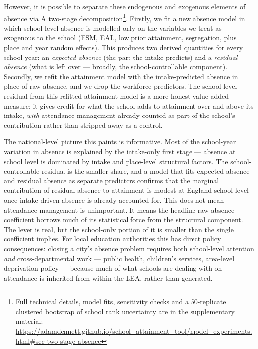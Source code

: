 \documentclass[
  12pt,
  titlepage]{article}
\begin{document}
However, it is possible to separate these endogenous and exogenous
elements of absence via A two-stage decomposition\footnote{Full
  technical details, model fits, sensitivity checks and a 50-replicate
  clustered bootstrap of school rank uncertainty are in the
  supplementary material:
  \url{https://adamdennett.github.io/school_attainment_tool/model_experiments.html\#sec-two-stage-absence}}.
Firstly, we fit a new absence model in which school-level absence is
modelled only on the variables we treat as exogenous to the school (FSM,
EAL, low prior attainment, segregation, plus place and year random
effects). This produces two derived quantities for every school-year: an
\emph{expected absence} (the part the intake predicts) and a
\emph{residual absence} (what is left over --- broadly, the
school-controllable component). Secondly, we refit the attainment model
with the intake-predicted absence in place of raw absence, and we drop
the workforce predictors. The school-level residual from this refitted
attainment model is a more honest value-added measure: it gives credit
for what the school adds to attainment over and above its intake,
\emph{with} attendance management already counted as part of the
school's contribution rather than stripped away as a control.

The national-level picture this paints is informative. Most of the
school-year variation in absence is explained by the intake-only first
stage --- absence at school level is dominated by intake and place-level
structural factors. The school-controllable residual is the smaller
share, and a model that fits expected absence and residual absence as
separate predictors confirms that the marginal contribution of residual
absence to attainment is modest at England school level once
intake-driven absence is already accounted for. This does not mean
attendance management is unimportant. It means the headline raw-absence
coefficient borrows much of its statistical force from the structural
component. The lever is real, but the school-only portion of it is
smaller than the single coefficient implies. For local education
authorities this has direct policy consequences: closing a city's
absence problem requires both school-level attention \emph{and}
cross-departmental work --- public health, children's services,
area-level deprivation policy --- because much of what schools are
dealing with on attendance is inherited from within the LEA, rather than
generated.
\end{document}

